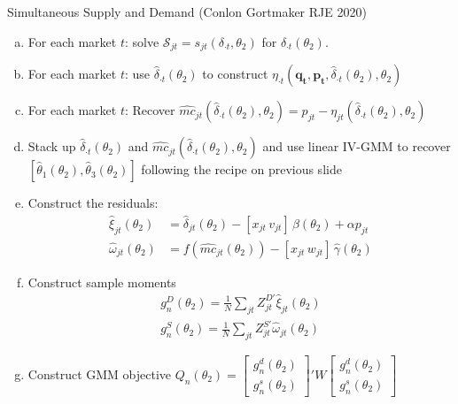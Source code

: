 \documentclass[xcolor=pdftex,dvipsnames,table,mathserif,aspectratio=169]{beamer}
\begin{document}
\begin{frame}{Simultaneous Supply and Demand (Conlon Gortmaker RJE 2020)}
\tiny
\begin{enumerate}[(a)]
\item For each market $t$: solve $\mathcal{S}_{jt} = s_{jt}(\delta_{\cdot t},\theta_2)$ for $\widehat{\delta}_{\cdot t}(\theta_2)$.
\item For each market $t$: use $\widehat{\delta}_{\cdot t}(\theta_2)$ to construct $\eta_{\cdot 
t}(\mathbf{q_t},\mathbf{p_t},\widehat{\delta}_{\cdot t}(\theta_2),\theta_2)$
\item For each market $t$: Recover $\widehat{mc}_{jt}(\widehat{\delta}_{\cdot t}(\theta_2),\theta_2) = p_{jt} - \eta_{jt}(\widehat{\delta}_{\cdot t}(\theta_2),\theta_2)$
\item Stack up $\widehat{\delta}_{\cdot t}(\theta_2)$ and $\widehat{mc}_{jt}(\widehat{\delta}_{\cdot t}(\theta_2),\theta_2)$ and use linear IV-GMM to recover $[\widehat{\theta}_1(\theta_2), \widehat{\theta}_3(\theta_2) ]$ following the recipe on previous slide
\item Construct the residuals:
\begin{align*}
\nonumber    \widehat{\xi}_{jt}(\theta_2) &= \widehat{\delta}_{jt}(\theta_2) -   [x_{jt}\, v_{jt}]\, \widehat{\beta}(\theta_2) + \alpha p_{jt}\\
    \widehat{\omega}_{jt}(\theta_2) &= f(\widehat{mc}_{jt}(\theta_2)) -  [x_{jt}\, w_{jt}]\, \widehat{\gamma}(\theta_2)
\end{align*}
\item Construct sample moments
\begin{align*}
\nonumber g_n^D(\theta_2)=\frac{1}{N} \sum_{jt} Z_{jt}^{D\prime} \widehat{\xi}_{jt}(\theta_2)\\
 g_n^S(\theta_2)=\frac{1}{N} \sum_{jt} Z_{jt}^{S \prime} \widehat{\omega}_{jt}(\theta_2)
\end{align*}
\item Construct GMM objective $Q_n(\theta_2)= \left[ {\begin{array}{c} g_n^d(\theta_2) \\ g_n^s(\theta_2) \end{array} } \right]' W  \left[ {\begin{array}{c} g_n^d(\theta_2) \\ g_n^s(\theta_2) \end{array} } \right] $
\end{enumerate}
\end{frame}
\end{document}
